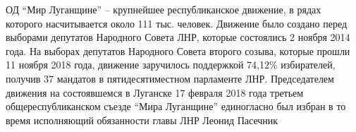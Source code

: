 ОД \enquote{Мир Луганщине} – крупнейшее республиканское движение, в рядах которого
насчитывается около 111 тыс. человек. Движение было создано перед выборами
депутатов Народного Совета ЛНР, которые состоялись 2 ноября 2014 года. На
выборах депутатов Народного Совета второго созыва, которые прошли 11 ноября
2018 года, движение заручилось поддержкой 74,12\% избирателей, получив 37
мандатов в пятидесятиместном парламенте ЛНР. Председателем движения на
состоявшемся в Луганске 17 февраля 2018 года третьем общереспубликанском съезде
\enquote{Мира Луганщине} единогласно был избран в то время исполняющий обязанности
главы ЛНР Леонид Пасечник

